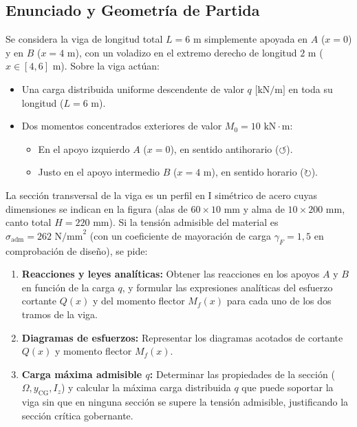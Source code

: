 \subsection{Enunciado y Geometría de Partida}

Se considera la viga de longitud total $L = 6\text{ m}$ simplemente apoyada en $A$ ($x = 0$) y en $B$ ($x = 4\text{ m}$), con un voladizo en el extremo derecho de longitud $2\text{ m}$ ($x \in [4, 6]\text{ m}$). Sobre la viga actúan:
\begin{itemize}
    \item Una carga distribuida uniforme descendente de valor $q\text{ [kN/m]}$ en toda su longitud ($L = 6\text{ m}$).
    \item Dos momentos concentrados exteriores de valor $M_0 = 10\text{ kN}\cdot\text{m}$:
          \begin{itemize}
              \item En el apoyo izquierdo $A$ ($x = 0$), en sentido antihorario ($\circlearrowleft$).
              \item Justo en el apoyo intermedio $B$ ($x = 4\text{ m}$), en sentido horario ($\circlearrowright$).
          \end{itemize}
\end{itemize}
La sección transversal de la viga es un perfil en I simétrico de acero cuyas dimensiones se indican en la figura (alas de $60 \times 10\text{ mm}$ y alma de $10 \times 200\text{ mm}$, canto total $H = 220\text{ mm}$). Si la tensión admisible del material es $\sigma_{\text{adm}} = 262\text{ N/mm}^2$ (con un coeficiente de mayoración de carga $\gamma_F = 1{,}5$ en comprobación de diseño), se pide:

\begin{enumerate}[label=\alph*)]
    \item \textbf{Reacciones y leyes analíticas:} Obtener las reacciones en los apoyos $A$ y $B$ en función de la carga $q$, y formular las expresiones analíticas del esfuerzo cortante $Q(x)$ y del momento flector $M_f(x)$ para cada uno de los dos tramos de la viga.
    \item \textbf{Diagramas de esfuerzos:} Representar los diagramas acotados de cortante $Q(x)$ y momento flector $M_f(x)$.
    \item \textbf{Carga máxima admisible $q$:} Determinar las propiedades de la sección ($\Omega, y_{\text{CG}}, I_z$) y calcular la máxima carga distribuida $q$ que puede soportar la viga sin que en ninguna sección se supere la tensión admisible, justificando la sección crítica gobernante.
\end{enumerate}

